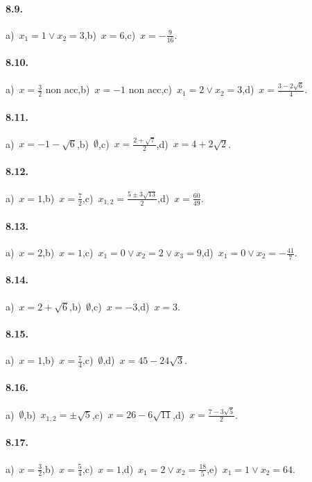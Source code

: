 \begin{multicols}{2}
\paragraph{8.9.} a)~$x_1=1\vee x_2=3$,\quad b)~$x=6$,\quad c)~$x=-\frac 9{16}$.

\paragraph{8.10.} a)~$x=\frac 3 2$ non acc,\quad b)~$x=-1$ non acc,\quad c)~$x_1=2\vee x_2=3$,\quad d)~$x=\frac{3-2\sqrt 6} 4$.

\paragraph{8.11.} a)~$x=-1-\sqrt 6$,\quad b)~$\emptyset $,\quad c)~$x=\frac{2+\sqrt 7} 2$,\quad d)~$x=4+2\sqrt 2$.

\paragraph{8.12.} a)~$x=1$,\quad b)~$x=\frac 7 2$,\quad c)~$x_{1,2}=\frac{5\pm 3\sqrt{13}} 2$,\quad d)~$x=\frac{60}{49}$.

\paragraph{8.13.} a)~$x=2$,\quad b)~$x=1$,\quad c)~$x_1=0\vee x_2=2\vee x_3=9$,\quad d)~$x_1=0\vee x_2=-\frac{41} 7$.

\paragraph{8.14.} a)~$x=2+\sqrt 6$,\quad b)~$\emptyset $,\quad c)~$x=-3$,\quad d)~$x=3$.

\paragraph{8.15.} a)~$x=1$,\quad b)~$x=\frac{7}{4}$,\quad c)~$\emptyset$,\quad d)~$x=45-24\sqrt{3}$.

\paragraph{8.16.} a)~$\emptyset $,\quad b)~$x_{1,2}=\pm \sqrt 5$,\quad c)~$x=26-6\sqrt{11}$,\quad d)~$x=\frac{7-3\sqrt 5} 2$.

\paragraph{8.17.} a)~$x=\frac 3 2$,\quad b)~$x=\frac 5 4$,\quad c)~$x=1$,\quad d)~$x_1=2\vee x_2=\frac{18} 5$,\quad e)~$x_1=1\vee x_2=64$.


\end{multicols}
